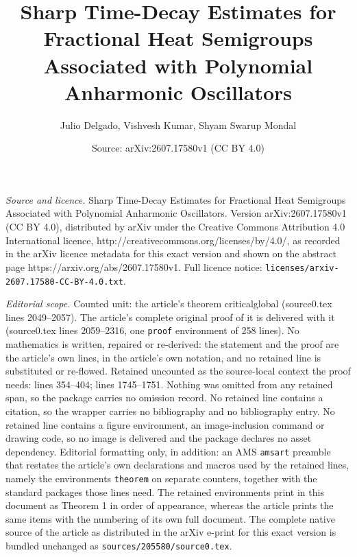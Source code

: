 \documentclass[10pt,a4paper]{amsart}
\title{Sharp Time-Decay Estimates for Fractional Heat Semigroups Associated with Polynomial Anharmonic Oscillators}
\author{Julio Delgado, Vishvesh Kumar, Shyam Swarup Mondal}
\date{Source: arXiv:2607.17580v1 (CC BY 4.0)}
\begin{document}
\maketitle

\noindent\emph{Source and licence.} Sharp Time-Decay Estimates for Fractional Heat Semigroups Associated with Polynomial Anharmonic Oscillators. Version arXiv:2607.17580v1 (CC BY 4.0), distributed by arXiv under the Creative Commons Attribution 4.0 International licence, http://creativecommons.org/licenses/by/4.0/, as recorded in the arXiv licence metadata for this exact version and shown on the abstract page https://arxiv.org/abs/2607.17580v1. Full licence notice: \texttt{licenses/arxiv-2607.17580-CC-BY-4.0.txt}.\par\smallskip

\noindent\textit{Editorial scope.} Counted unit: the article's theorem criticalglobal (source0.tex lines 2049--2057). The article's complete original proof of it is delivered with it (source0.tex lines 2059--2316, one \texttt{proof} environment of 258 lines). No mathematics is written, repaired or re-derived: the statement and the proof are the article's own lines, in the article's own notation, and no retained line is substituted or re-flowed.  Retained uncounted as the source-local context the proof needs: lines 354--404; lines 1745--1751.  Nothing was omitted from any retained span, so the package carries no omission record.  No retained line contains a citation, so the wrapper carries no bibliography and no bibliography entry.  No retained line contains a figure environment, an image-inclusion command or drawing code, so no image is delivered and the package declares no asset dependency.  Editorial formatting only, in addition: an AMS \texttt{amsart} preamble that restates the article's own declarations and macros used by the retained lines, namely the environments \texttt{theorem} on separate counters, together with the standard packages those lines need.  The retained environments print in this document as Theorem 1 in order of appearance, whereas the article prints the same items with the numbering of its own full document.  The complete native source of the article as distributed in the arXiv e-print for this exact version is bundled unchanged as \texttt{sources/205580/source0.tex}.
\end{document}
